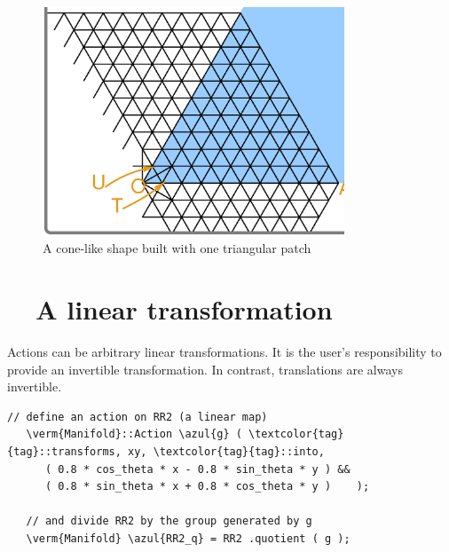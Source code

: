 \begin{figure}[ht] \centering
  \includegraphics[width=90mm]{sector-cut.eps}
  \caption{A cone-like shape built with one triangular patch}
  \label{\numb section 7.\numb fig 9}
\end{figure}


\section{~~A linear transformation}\label{\numb section 7.\numb parag 14}

Actions can be arbitrary linear transformations.
It is the user's responsibility to provide an invertible transformation.
In contrast, translations are always invertible.

\begin{Verbatim}[commandchars=\\\{\},formatcom=\small\tt,frame=single,
   label=parag-\ref{\numb section 7.\numb parag 14}.cpp,rulecolor=\color{coment},
   baselinestretch=0.94,framesep=2mm                                             ]
   // define an action on RR2 (a linear map)
   \verm{Manifold}::Action \azul{g} ( \textcolor{tag}{tag}::transforms, xy, \textcolor{tag}{tag}::into,
      ( 0.8 * cos_theta * x - 0.8 * sin_theta * y ) &&
      ( 0.8 * sin_theta * x + 0.8 * cos_theta * y )    );

   // and divide RR2 by the group generated by g
   \verm{Manifold} \azul{RR2_q} = RR2 .quotient ( g );
\end{Verbatim}


